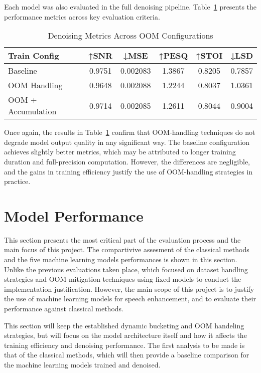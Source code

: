 Each model was also evaluated in the full denoising pipeline. Table~\ref{tab:oom_metrics} presents the performance metrics across key evaluation criteria.

\vspace{1em}
\begin{table}[H]
\centering
\caption{Denoising Metrics Across OOM Configurations}
\label{tab:oom_metrics}
\begin{tabular}{|l|c|c|c|c|c|}
\hline
\textbf{Train Config} & \textbf{↑SNR} & \textbf{↓MSE} & \textbf{↑PESQ} & \textbf{↑STOI} & \textbf{↓LSD} \\
\hline
Baseline               & 0.9751 & 0.002083 & 1.3867 & 0.8205 & 0.7857 \\
OOM Handling           & 0.9648 & 0.002088 & 1.2244 & 0.8037 & 1.0361 \\
OOM + Accumulation     & 0.9714 & 0.002085 & 1.2611 & 0.8044 & 0.9004 \\
\hline
\end{tabular}
\end{table}

Once again, the results in Table~\ref{tab:oom_metrics} confirm that OOM-handling techniques do not degrade model output quality in any significant way. The baseline configuration achieves slightly better metrics, which may be attributed to longer training duration and full-precision computation. However, the differences are negligible, and the gains in training efficiency justify the use of OOM-handling strategies in practice.


\section{Model Performance}
\label{sec:model_performance}

This section presents the most critical part of the evaluation process and the main focus of this project. The compartivive assesment of the classical methods and the five machine learning models performances is shown in this section. Unlike the previous evaluations taken place, which focused on dataset handling strategies and OOM mitigation techniques using fixed models to conduct the implementation justification. However, the main scope of this project is to justify the use of machine learning models for speech enhancement, and to evaluate their performance against classical methods.

This section will keep the established dynamic bucketing and OOM handeling strategies, but will focus on the model architecture itself and how it affects the training efficiency and denoising performance. The first analysis to be made is that of the classical methods, which will then provide a baseline comparison for the machine learning models trained and denoised.

